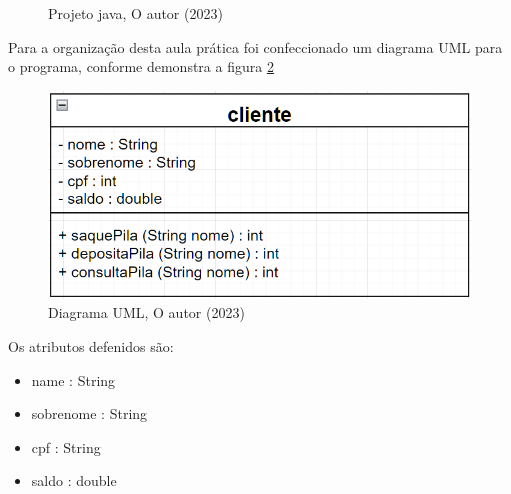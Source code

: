 \begin{figure}[h!]
  \caption{Projeto java, O autor (2023)}\label{fig:project}

\end{figure}

\newpage


\par Para a organização desta aula prática foi confeccionado um diagrama UML para o programa, conforme demonstra a figura \ref{fig:uml}

\begin{figure}[h!]
  \includegraphics[width=\textwidth]{figure/uml_classe.png}
  \caption{Diagrama UML, O autor (2023)}
  \label{fig:uml}
\end{figure}
\newpage
\par Os atributos defenidos são:
\begin{itemize}
  \item name : String
  \item sobrenome : String
  \item cpf : String
  \item saldo : double
\end{itemize}

